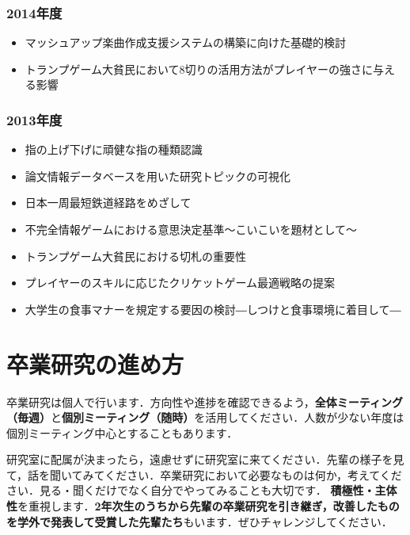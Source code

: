 \documentclass[a4paper,uplatex,dvipdfm]{bxjsarticle}
\begin{document}
\begin{minipage}[t]{.46\textwidth}
{\footnotesize
\subsubsection*{2014年度}
\begin{itemize}
  \item マッシュアップ楽曲作成支援システムの構築に向けた基礎的検討
  \item トランプゲーム大貧民において8切りの活用方法がプレイヤーの強さに与える影響
\end{itemize}
\vspace{-.4cm}
\subsubsection*{2013年度}
\begin{itemize}
  \item 指の上げ下げに頑健な指の種類認識
  \item 論文情報データベースを用いた研究トピックの可視化
  \item 日本一周最短鉄道経路をめざして
  \item 不完全情報ゲームにおける意思決定基準～こいこいを題材として～
  \item トランプゲーム大貧民における切札の重要性
  \item プレイヤーのスキルに応じたクリケットゲーム最適戦略の提案
  \item 大学生の食事マナーを規定する要因の検討―しつけと食事環境に着目して―
\end{itemize}
}
\end{minipage}

\section{卒業研究の進め方}

卒業研究は個人で行います．方向性や進捗を確認できるよう，{\sffamily\bfseries 全体ミーティング（毎週）}と{\sffamily\bfseries 個別ミーティング（随時）}を活用してください．人数が少ない年度は個別ミーティング中心とすることもあります．

研究室に配属が決まったら，遠慮せずに研究室に来てください．先輩の様子を見て，話を聞いてみてください．卒業研究において必要なものは何か，考えてください．見る・聞くだけでなく自分でやってみることも大切です．
{\sffamily\bfseries 積極性・主体性}を重視します．{\sffamily\bfseries 2年次生のうちから先輩の卒業研究を引き継ぎ，改善したものを学外で発表して受賞した先輩たち}もいます．ぜひチャレンジしてください．
\vspace{-.3cm}
\end{document}
